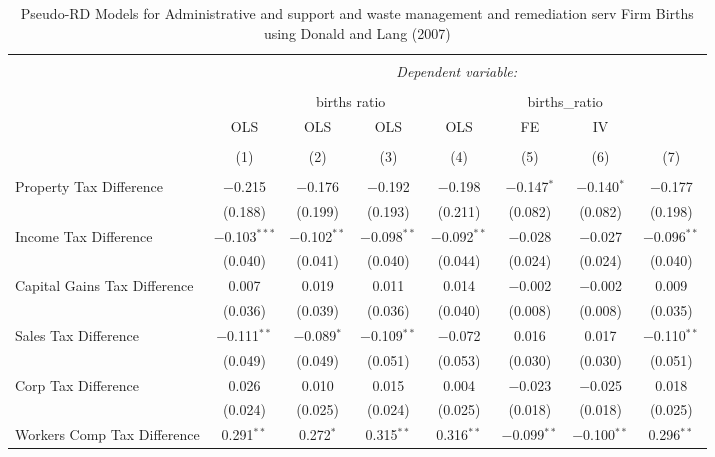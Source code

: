 
\begin{table}[!htbp] \centering 
  \caption{Pseudo-RD Models for  Administrative and support and waste management and remediation serv Firm Births using Donald and Lang (2007)} 
  \label{} 
\begin{tabular}{@{\extracolsep{5pt}}lccccccc} 
\\[-1.8ex]\hline 
\hline \\[-1.8ex] 
 & \multicolumn{7}{c}{\textit{Dependent variable:}} \\ 
\cline{2-8} 
\\[-1.8ex] & \multicolumn{4}{c}{births ratio} & \multicolumn{2}{c}{births\_ratio} &   \\ 
 & OLS & OLS & OLS & OLS & FE & IV &  \\ 
\\[-1.8ex] & (1) & (2) & (3) & (4) & (5) & (6) & (7)\\ 
\hline \\[-1.8ex] 
 Property Tax Difference & $-$0.215 & $-$0.176 & $-$0.192 & $-$0.198 & $-$0.147$^{*}$ & $-$0.140$^{*}$ & $-$0.177 \\ 
  & (0.188) & (0.199) & (0.193) & (0.211) & (0.082) & (0.082) & (0.198) \\ 
  Income Tax Difference & $-$0.103$^{***}$ & $-$0.102$^{**}$ & $-$0.098$^{**}$ & $-$0.092$^{**}$ & $-$0.028 & $-$0.027 & $-$0.096$^{**}$ \\ 
  & (0.040) & (0.041) & (0.040) & (0.044) & (0.024) & (0.024) & (0.040) \\ 
  Capital Gains Tax Difference & 0.007 & 0.019 & 0.011 & 0.014 & $-$0.002 & $-$0.002 & 0.009 \\ 
  & (0.036) & (0.039) & (0.036) & (0.040) & (0.008) & (0.008) & (0.035) \\ 
  Sales Tax Difference & $-$0.111$^{**}$ & $-$0.089$^{*}$ & $-$0.109$^{**}$ & $-$0.072 & 0.016 & 0.017 & $-$0.110$^{**}$ \\ 
  & (0.049) & (0.049) & (0.051) & (0.053) & (0.030) & (0.030) & (0.051) \\ 
  Corp Tax Difference & 0.026 & 0.010 & 0.015 & 0.004 & $-$0.023 & $-$0.025 & 0.018 \\ 
  & (0.024) & (0.025) & (0.024) & (0.025) & (0.018) & (0.018) & (0.025) \\ 
  Workers Comp Tax Difference & 0.291$^{**}$ & 0.272$^{*}$ & 0.315$^{**}$ & 0.316$^{**}$ & $-$0.099$^{**}$ & $-$0.100$^{**}$ & 0.296$^{**}$ \\ 

\end{tabular}
\end{table}
